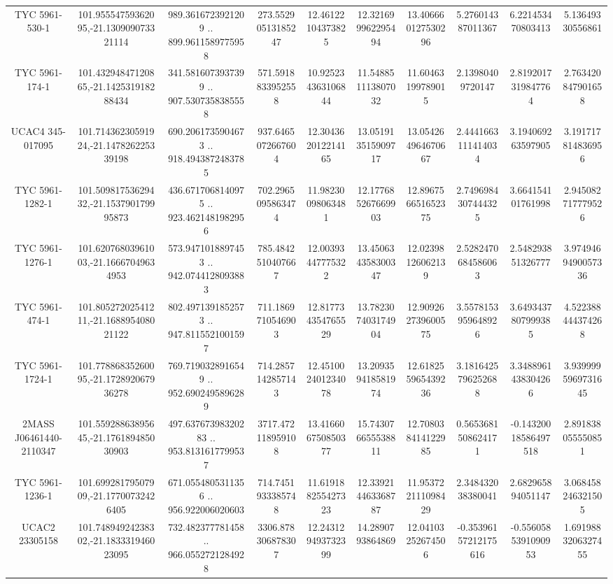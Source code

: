 \begin{table}
\begin{tabular}{cccccccccc}
TYC 5961-530-1 & 101.95554759362095,-21.130909073321114 & 989.3616723921209 .. 899.9611589775958 & 273.55290513185247 & 12.46122104373825 & 12.321699962295494 & 13.406660127530296 & 5.276014387011367 & 6.221453470803413 & 5.13649330556861 \\
TYC 5961-174-1 & 101.43294847120865,-21.142531918288434 & 341.5816073937399 .. 907.5307358385558 & 571.5918833952558 & 10.925234363106844 & 11.548851113807032 & 11.60463199789015 & 2.13980409720147 & 2.8192017319847764 & 2.763420847901658 \\
UCAC4 345-017095 & 101.71436230591924,-21.147826225339198 & 690.2061735904673 .. 918.4943872483785 & 937.6465072667604 & 12.304362012214165 & 13.051913515909717 & 13.054264964670667 & 2.4441663111414034 & 3.194069263597905 & 3.191717814836956 \\
TYC 5961-1282-1 & 101.50981753629432,-21.153790179995873 & 436.6717068140975 .. 923.4621481982956 & 702.2965095863474 & 11.98230098063481 & 12.177685267669903 & 12.896756651652375 & 2.7496984307444325 & 3.664154101761998 & 2.945082717779526 \\
TYC 5961-1276-1 & 101.62076803961003,-21.16667049634953 & 573.9471018897453 .. 942.0744128093883 & 785.4842510407667 & 12.00393447775322 & 13.450634358300347 & 12.02398126062139 & 2.5282470684586063 & 2.548293851326777 & 3.9749469490057336 \\
TYC 5961-474-1 & 101.80527202541211,-21.168895408021122 & 802.4971391852573 .. 947.8115521001597 & 711.1869710546903 & 12.817734354765529 & 13.782307403174904 & 12.909262739600575 & 3.5578153959648926 & 3.6493437807999385 & 4.522388444374268 \\
TYC 5961-1724-1 & 101.77886835260095,-21.172892067936278 & 769.7190328916549 .. 952.6902495896289 & 714.2857142857143 & 12.451002401234078 & 13.209359418581974 & 12.618255965439236 & 3.1816425796252688 & 3.3488961438304266 & 3.9399995969731645 \\
2MASS J06461440-2110347 & 101.55928863895645,-21.176189485030903 & 497.63767398320283 .. 953.8131617799537 & 3717.472118959108 & 13.416606750850377 & 15.743076655538811 & 12.708038414122985 & 0.5653681508624171 & -0.14320018586497518 & 2.891838055550851 \\
TYC 5961-1236-1 & 101.69928179507909,-21.17700732426405 & 671.0554805311356 .. 956.922006020603 & 714.7451933385748 & 11.619188255427323 & 12.339214463368787 & 11.953722111098429 & 2.348432038380041 & 2.682965894051147 & 3.068458246321505 \\
UCAC2  23305158 & 101.74894924238302,-21.183331946023095 & 732.482377781458 .. 966.0552721284928 & 3306.878306878307 & 12.243129493732399 & 14.2890793864869 & 12.04103252674506 & -0.35396157212175616 & -0.5560585391090953 & 1.6919883206327455 \\
\end{tabular}
\end{table}
